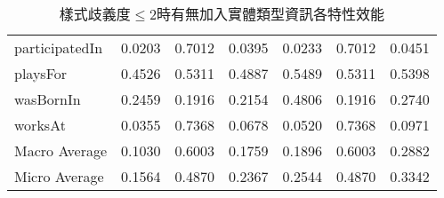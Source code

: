 \begin{table}[htbp]
\begin{tabular}{|l||c|c|c||c|c|c|}
 participatedIn & 0.0203 & 0.7012 & 0.0395 & 0.0233 & 0.7012 & 0.0451 \\
 playsFor & 0.4526 & 0.5311 & 0.4887 & 0.5489 & 0.5311 & 0.5398 \\
 wasBornIn & 0.2459 & 0.1916 & 0.2154 & 0.4806 & 0.1916 & 0.2740 \\
 worksAt & 0.0355 & 0.7368 & 0.0678 & 0.0520 & 0.7368 & 0.0971 \\
    \hline
 Macro Average & 0.1030 & 0.6003 & 0.1759 & 0.1896 & 0.6003 & 0.2882 \\
 Micro Average & 0.1564 & 0.4870 & 0.2367 & 0.2544 & 0.4870 & 0.3342 \\
    \hline
 \end{tabular}
\caption{樣式歧義度$\leq$2時有無加入實體類型資訊各特性效能}
 \label{t:type}
 \end{table}

